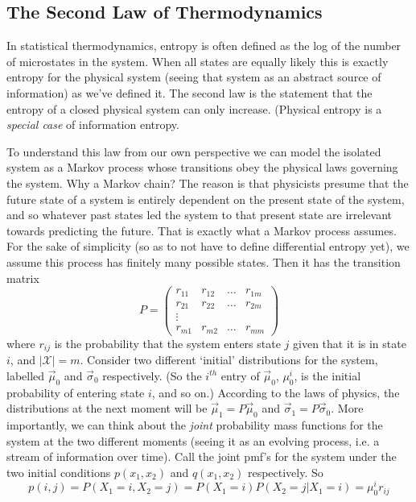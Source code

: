 \documentclass{article}
\theoremstyle{definition}
\theoremstyle{plain}
\begin{document}
\subsection{The Second Law of Thermodynamics}
	In statistical thermodynamics, entropy is often defined as the log of the number of microstates in the system. When all states are equally likely this is exactly entropy for the physical system (seeing that system as an abstract source of information) as we've defined it. The second law is the statement that the entropy of a closed physical system can only increase. (Physical entropy is a \emph{special case} of information entropy.  \par 
	To understand this law from our own perspective we can model the isolated system as a Markov process whose transitions obey the physical laws governing the system. Why a Markov chain? The reason is that physicists presume that the future state of a system is entirely dependent on the present state of the system, and so whatever past states led the system to that present state are irrelevant towards predicting the future. That is exactly what a Markov process assumes. For the sake of simplicity (so as to not have to define differential entropy yet), we assume this process has finitely many possible states. Then it has the transition matrix
	\[ P = \begin{pmatrix} r_{11} & r_{12} & \ldots & r_{1m} \\
							r_{21} & r_{22} & \ldots & r_{2m} \\
							\vdots \\ r_{m1} & r_{m2} & \ldots & r_{mm} \end{pmatrix} \]
where $r_{ij}$ is the probability that the system enters state $j$ given that it is in state $i$, and $|\mathcal{X}| = m$. Consider two different `initial' distributions for the system, labelled $\vec{\mu}_0$ and $\vec{\sigma}_0$ respectively. (So the $i^{th}$ entry of $\vec{\mu}_0$, $\mu_0^i$, is the initial probability of entering state $i$, and so on.) According to the laws of physics, the distributions at the next moment will be $\vec{\mu}_1 = P\vec{\mu}_0$ and $\vec{\sigma}_1 = P\vec{\sigma}_0$. More importantly, we can think about the \emph{joint} probability mass functions for the system at the two different moments (seeing it as an evolving process, i.e. a stream of information over time). Call the joint pmf's for the system under the two initial conditions $p(x_1,x_2)$ and $q(x_1,x_2)$ respectively. So 
\[ p(i,j) = P(X_1 = i, X_2 = j) = P(X_1 = i)P(X_2 = j|X_1 = i) = \mu_0^ir_{ij} \]
\end{document}
